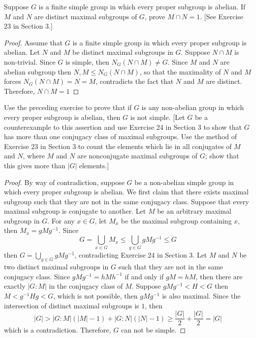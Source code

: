 \documentclass{article}
\newenvironment{problem}[2][Problem]{\begin{trivlist}
\item[\hskip \labelsep {\bfseries #1}\hskip \labelsep {\bfseries #2.}]}{\end{trivlist}}
\begin{document}
\begin{problem}{52}
    Suppose $G$ is a finite simple group in which every proper subgroup is abelian. 
    If $M$ and $N$ are distinct maximal subgroups of $G$, prove $M \cap N = 1$. 
    [See Exercise 23 in Section 3.]
\end{problem}
\begin{proof}
    Assume that $G$ is a finite simple group in which every proper subgroup is abelian. Let $N$ and $M$ be distinct maximal subgroups in $G$. Suppose $N\cap M$ is non-trivial. Since $G$ is simple, then $N_G(N\cap M)\neq G$. Since $M$ and $N$ are abelian subgroup then $N, M\leq N_G(N\cap M)$, so that the maximality of $N$ and $M$ forces $N_G(N\cap M)=N=M$, contradicts the fact that $N$ and $M$ are distinct. Therefore, $N\cap M=1$
\end{proof}
\begin{problem}{53}
    Use the preceding exercise to prove that if $G$ is any non-abelian group in which every proper subgroup is abelian, then $G$ is not simple. 
    [Let $G$ be a counterexample to this assertion and use Exercise 24 in Section 3 to show that $G$ has more than one conjugacy class of maximal subgroups. 
    Use the method of Exercise 23 in Section 3 to count the elements which lie in all conjugates of $M$ and $N$, where $M$ and $N$ are nonconjugate maximal subgroups of $G$; 
    show that this gives more than $|G|$ elements.]
\end{problem}
\begin{proof}
    By way of contradiction, suppose $G$ be a non-abelian simple group in which every proper subgroup is abelian. We first claim that there exists maximal subgroup such that they are not in the same conjugacy class. Suppose that every maximal subgroup is conjugate to another. Let $M$ be an arbitrary maximal subgroup in $G$. For any $x \in G$, let $M_x$ be the maximal subgroup containing $x$, then $M_x = gMg^{-1}$. Since 
    \[
        G=\bigcup_{x\in G}M_x \leq \bigcup_{g\in G}gMg^{-1} \leq G
    \]
    then $G=\bigcup_{g\in G}gMg^{-1}$, contradicting Exercise 24 in Section 3. Let $M$ and $N$ be two distinct maximal subgroups in $G$ such that they are not in the same conjugacy class. Since $gMg^{-1}=hMh^{-1}$ if and only if $g M=hM$, then there are exactly $|G:M|$ in the conjugacy class of $M$. Suppose $gMg^{-1}<H<G$ then 
    $M<g^{-1}Hg<G$, which is not possible, then $gMg^{-1}$ is also maximal. Since the intersection of distinct maximal subgroups is $1$, then 
    \[
        |G|>|G:M|(|M|-1)+|G:N|(|N|-1)\geq \frac{|G|}{2}+\frac{|G|}{2}=|G|
    \]
    which is a contradiction. Therefore, $G$ can not be simple.
\end{proof}
\end{document}
